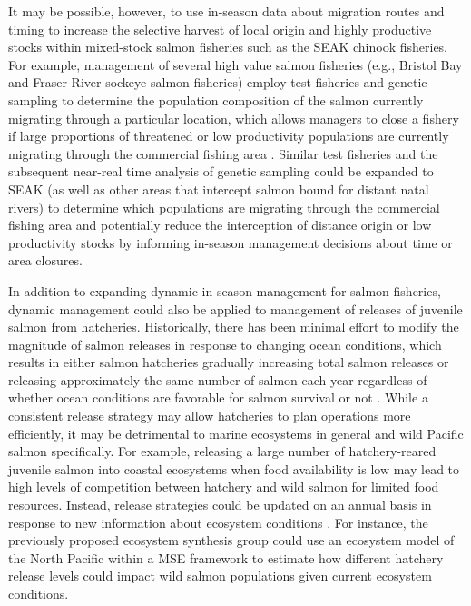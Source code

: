 It may be possible, however, to use in-season data about migration
routes and timing to increase the selective harvest of local origin and
highly productive stocks within mixed-stock salmon fisheries such as the
SEAK chinook fisheries. For example, management of several high value
salmon fisheries (e.g., Bristol Bay and Fraser River sockeye salmon
fisheries) employ test fisheries and genetic sampling to determine the
population composition of the salmon currently migrating through a
particular location, which allows managers to close a fishery if large
proportions of threatened or low productivity populations are currently
migrating through the commercial fishing area \citep{Dann2013}. Similar
test fisheries and the subsequent near-real time analysis of genetic
sampling could be expanded to SEAK (as well as other areas that
intercept salmon bound for distant natal rivers) to determine which
populations are migrating through the commercial fishing area and
potentially reduce the interception of distance origin or low
productivity stocks by informing in-season management decisions about
time or area closures.

In addition to expanding dynamic in-season management for salmon
fisheries, dynamic management could also be applied to management of
releases of juvenile salmon from hatcheries. Historically, there has
been minimal effort to modify the magnitude of salmon releases in
response to changing ocean conditions, which results in either salmon
hatcheries gradually increasing total salmon releases or releasing
approximately the same number of salmon each year regardless of whether
ocean conditions are favorable for salmon survival or not
\citep{Pearsons2010a}. While a consistent release strategy may allow
hatcheries to plan operations more efficiently, it may be detrimental to
marine ecosystems in general and wild Pacific salmon specifically. For
example, releasing a large number of hatchery-reared juvenile salmon
into coastal ecosystems when food availability is low may lead to high
levels of competition between hatchery and wild salmon for limited food
resources. Instead, release strategies could be updated on an annual
basis in response to new information about ecosystem conditions
\citep{Pearsons2010a, Peterman1983a}. For instance, the previously
proposed ecosystem synthesis group could use an ecosystem model of the
North Pacific within a MSE framework to estimate how different hatchery
release levels could impact wild salmon populations given current
ecosystem conditions.



